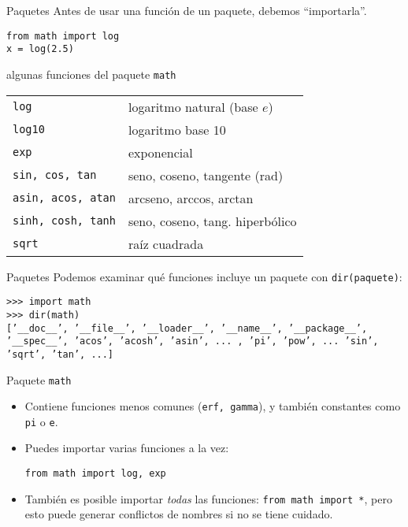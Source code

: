 \documentclass[10pt]{beamer}
\begin{document}
\begin{frame}{Paquetes}
Antes de usar una función de un paquete, debemos “importarla”.
\begin{example}
\texttt{from math import log}\\
\texttt{x = log(2.5)}
\end{example}

\footnotesize
\begin{block}{algunas funciones del paquete \texttt{math}}
\begin{tabular}{ll}
\texttt{log}              & logaritmo natural (base \(e\)) \\
\texttt{log10}            & logaritmo base 10              \\
\texttt{exp}              & exponencial                    \\
\texttt{sin, cos, tan}    & seno, coseno, tangente (rad)   \\
\texttt{asin, acos, atan} & arcseno, arccos, arctan        \\
\texttt{sinh, cosh, tanh} & seno, coseno, tang. hiperbólico\\
\texttt{sqrt}             & raíz cuadrada
\end{tabular}
\end{block}
\end{frame}

\begin{frame}[fragile]{Paquetes}
Podemos examinar qué funciones incluye un paquete con \texttt{dir(paquete)}:
\begin{example}\footnotesize
\verb|>>> import math|\\
\verb|>>> dir(math)|\\
\texttt{['\_\_doc\_\_', '\_\_file\_\_', '\_\_loader\_\_', '\_\_name\_\_', '\_\_package\_\_', 
'\_\_spec\_\_', 'acos', 'acosh', 'asin', ... , 'pi', 'pow', ... 'sin', 'sqrt', 'tan', ...]}
\end{example}

\end{frame}

\begin{frame}[fragile]{Paquete \texttt{math}}
\begin{itemize}
	\item Contiene funciones menos comunes (\texttt{erf, gamma}), y también constantes como \texttt{pi} o \texttt{e}.
	\item Puedes importar varias funciones a la vez:
\begin{example}
\texttt{from math import log, exp}
\end{example}
	\item También es posible importar \textit{todas} las funciones: \texttt{from math import *}, pero esto puede generar conflictos de nombres si no se tiene cuidado.
\end{itemize}
\end{frame}
\end{document}
